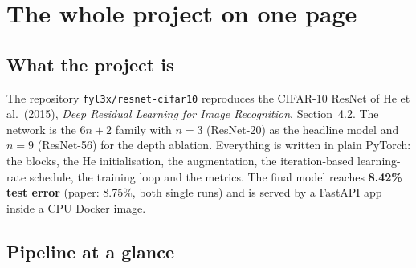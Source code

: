 \section{The whole project on one page}
\label{sec:overview}

\subsection{What the project is}

The repository \href{https://github.com/fyl3x/resnet-cifar10}{\texttt{fyl3x/resnet-cifar10}} reproduces the CIFAR-10 ResNet of He et al.\ (2015), \emph{Deep Residual Learning for Image Recognition}, Section~4.2. The network is the $6n+2$ family with $n=3$ (ResNet-20) as the headline model and $n=9$ (ResNet-56) for the depth ablation. Everything is written in plain PyTorch: the blocks, the He initialisation, the augmentation, the iteration-based learning-rate schedule, the training loop and the metrics. The final model reaches \textbf{8.42\% test error} (paper: 8.75\%, both single runs) and is served by a FastAPI app inside a CPU Docker image.

\subsection{Pipeline at a glance}

